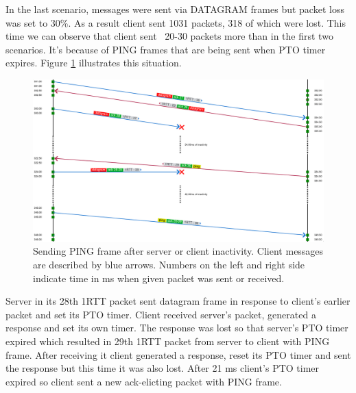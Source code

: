 In the last scenario, messages were sent via DATAGRAM frames but packet loss was set to 30\%.
As a result client sent 1031 packets, 318 of which were lost.
This time we can observe that client sent ~20-30 packets more than in the first two scenarios.
It's because of PING frames that are being sent when PTO timer expires. 
Figure \ref{fig:dgram_ping_frames} illustrates this situation.
 
\begin{figure}
  \centering
  \includegraphics[width=\textwidth]{img/__09__datagrams/dgram_retransmission_ping.png}
  \caption{Sending PING frame after server or client inactivity. 
  Client messages are described by blue arrows. 
  Numbers on the left and right side indicate time in ms when given packet was sent or received.}
  \label{fig:dgram_ping_frames}
\end{figure}

Server in its 28th 1RTT packet sent datagram frame in response to client's earlier packet and set its PTO timer.
Client received server's packet, generated a response and set its own timer.
The response was lost so that server's PTO timer expired which resulted in 29th 1RTT packet from server to client with PING frame. 
After receiving it client generated a response, reset its PTO timer and sent the response but this time it was also lost.
After 21 ms client's PTO timer expired so client sent a new ack-elicting packet with PING frame.

